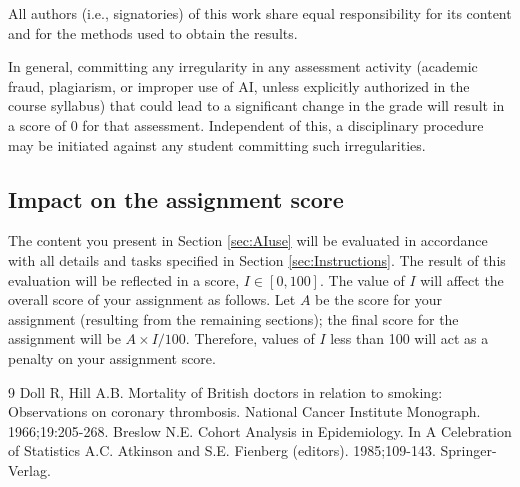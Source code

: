 \documentclass[10pt,a4paper,twoside]{article}\usepackage[]{graphicx}\usepackage[]{xcolor}
\begin{document}
All authors (i.e., signatories) of this work share equal responsibility for its content and for the methods used to obtain the results. 

In general, committing any irregularity in any assessment activity (academic fraud, plagiarism, or improper use of AI, unless explicitly authorized in the course syllabus) that could lead to a significant change in the grade will result in a score of 0 for that assessment. Independent of this, a disciplinary procedure may be initiated against any student committing such irregularities.

\subsection{Impact on the assignment score}
The content you present in Section \ref{sec:AIuse} will be evaluated in accordance with all details and tasks specified in Section \ref{sec:Instructions}. The result of this evaluation will be reflected in a score,
$I \in [0, 100]$. The value of $I$ will affect the overall score of your assignment as follows. Let $A$ be the score for your assignment (resulting from the remaining sections); the final score for the assignment will be $A \times I/100$. Therefore, values of $I$ less than 100 will act as a
penalty on your assignment score.



\newpage
\begin{thebibliography}{9}
 Doll R, Hill A.B. Mortality of British doctors in relation to smoking: Observations on coronary thrombosis. National Cancer Institute Monograph. 1966;19:205-268.
 Breslow N.E. Cohort Analysis in Epidemiology. In A Celebration of Statistics A.C. Atkinson and S.E. Fienberg (editors). 1985;109-143. Springer-Verlag.
\end{thebibliography}
\end{document}

